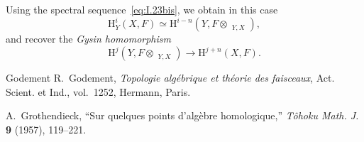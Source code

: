 \documentclass[11pt]{article}
\newcommand{\uT}{\mathop{\underline{\mathrm T}}\nolimits}
\begin{document}
Using the spectral sequence~\eqref{eq:I.23bis}, we obtain in this case
\begin{equation}
  \mathrm H_Y^i(X,F)
  \simeq
  \mathrm H^{i-n}(Y,F\otimes\uT_{Y,X}),
  \tag{31}\label{eq:I.31}
\end{equation}
and recover the \emph{Gysin homomorphism}
\begin{equation}
  \mathrm H^j(Y,F\otimes\uT_{Y,X})
  \longrightarrow
  \mathrm H^{j+n}(X,F).
  \tag{32}\label{eq:I.32}
\end{equation}

\begin{thebibliography}{Godement}
R.~Godement, \emph{Topologie alg\'ebrique et th\'eorie des faisceaux},
Act. Scient. et Ind., vol.~1252, Hermann, Paris.

A.~Grothendieck, ``Sur quelques points d'alg\`ebre homologique,''
\emph{T\^ohoku Math. J.} \textbf{9} (1957), 119--221.
\end{thebibliography}
\end{document}
